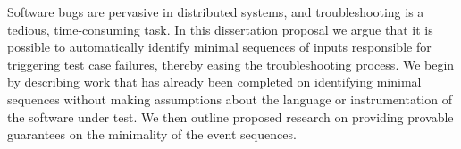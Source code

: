 Software bugs are pervasive in distributed systems,
and troubleshooting is a tedious, time-consuming task.
In this dissertation proposal we argue that it is possible to
automatically identify minimal sequences of inputs
responsible for triggering
test case failures, thereby easing the troubleshooting process.
We begin by describing work that has already been completed on
identifying minimal sequences without making assumptions about the
language or instrumentation of the software under test.
We then outline proposed research on providing provable guarantees on
the minimality of the event sequences.
